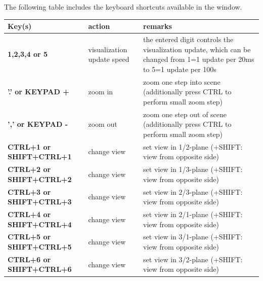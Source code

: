 \documentclass[11pt,a4paper]{book} %
\begin{document}
The following table includes the keyboard shortcuts available in the window. 

\begin{center}
  \footnotesize
  \begin{longtable}{| p{4cm} | p{4cm} | p{8cm} |} 
	\hline
  \bf Key(s) & action & \bf remarks \\ \hline
  \bf 1,2,3,4 or 5 & visualization update speed & the entered digit controls the visualization update, which can be changed from 1=1 update per 20ms to 5=1 update per 100s\\ \hline
  \bf '.' or KEYPAD + & zoom in & zoom one step into scene (additionally press CTRL to perform small zoom step)\\ \hline
  \bf ',' or KEYPAD - & zoom out & zoom one step out of scene (additionally press CTRL to perform small zoom step)\\ \hline
  \bf CTRL+1 or SHIFT+CTRL+1& change view& set view in 1/2-plane (+SHIFT: view from opposite side) \\ \hline
  \bf CTRL+2 or SHIFT+CTRL+2& change view& set view in 1/3-plane (+SHIFT: view from opposite side) \\ \hline
  \bf CTRL+3 or SHIFT+CTRL+3& change view& set view in 2/3-plane (+SHIFT: view from opposite side) \\ \hline
  \bf CTRL+4 or SHIFT+CTRL+4& change view& set view in 2/1-plane (+SHIFT: view from opposite side) \\ \hline
  \bf CTRL+5 or SHIFT+CTRL+5& change view& set view in 3/1-plane (+SHIFT: view from opposite side) \\ \hline
  \bf CTRL+6 or SHIFT+CTRL+6& change view& set view in 3/2-plane (+SHIFT: view from opposite side) \\ \hline


\end{longtable}
\end{center}
\end{document}
